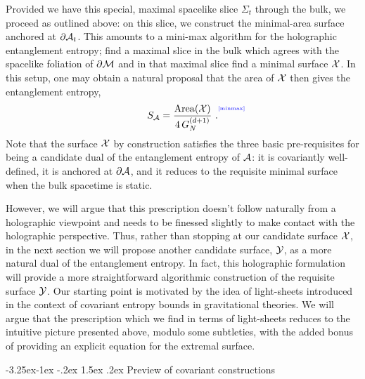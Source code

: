 \documentclass[12pt]{article}
\makeatletter
\renewcommand\subsection{\@startsection{subsection}{2}{\z@}%
                                     {-3.25ex\@plus -1ex \@minus -.2ex}%
                                     {1.5ex \@plus .2ex}%
                                     {\normalfont\bfseries}}
\def\p{\partial}
\def\CA{{\cal A}}
\def\CX{{\cal X}}
\def\CY{{\cal Y}}
\def\CSig{{\Sigma}}
\def\p{\partial}
\def\p{\partial}
\def\Label#1{\label{#1}%
{ \color{blue}{\smash{\hbox to0pt{\raise2ex\hbox{\tiny[#1]}\hss}}}}}
\def\bdy{\p{\cal M}}
\def\Lms{\CY}
\def\Xms{\CX}
\def\Sms{\CSig}
\def\rA{\CA}
\def\brA{\p \CA}
\def\area#1{{\rm Area}(#1)}
\makeatother
\begin{document}
Provided we have this special, maximal spacelike slice $\Sms_t$
through the bulk, we proceed as outlined above: on this slice, we
construct the minimal-area surface anchored at $\brA_t$. This
amounts to a mini-max algorithm for the holographic entanglement
entropy; find a maximal slice in the bulk which agrees with the
spacelike foliation of $\bdy$ and in that maximal slice find a
minimal surface $\Xms$. In this setup, one may obtain a natural
proposal that the area of $\Xms$ then gives the entanglement
entropy,
%
\begin{equation}
S_\rA = {\area{\Xms}  \over 4 \, G_N^{(d+1)} } \ .
\Label{minmax}
\end{equation}
%
Note that the surface $\Xms$ by construction satisfies the three basic pre-requisites for being a candidate dual of the entanglement entropy of $\rA$:  it is covariantly well-defined, it is anchored at $\brA$, and it reduces to the requisite minimal surface when the bulk spacetime is static.

However, we will argue that this prescription doesn't follow naturally from a holographic viewpoint and needs to be finessed slightly to make contact with the holographic perspective.
Thus, rather than stopping at our candidate surface $\Xms$, in the next section we will propose another candidate surface, $\Lms$, as a more natural dual of the entanglement entropy.
In fact, this holographic formulation will provide a more straightforward algorithmic construction of the requisite surface $\Lms$. Our starting point is motivated by the idea of light-sheets introduced in the context  of covariant entropy bounds in gravitational theories. We will argue that the prescription which we find in terms of light-sheets reduces to the intuitive picture presented above, modulo some subtleties, with the added bonus of providing an explicit equation for the extremal surface.


\subsection{Preview of covariant constructions}
\label{covEEprev}
\end{document}
